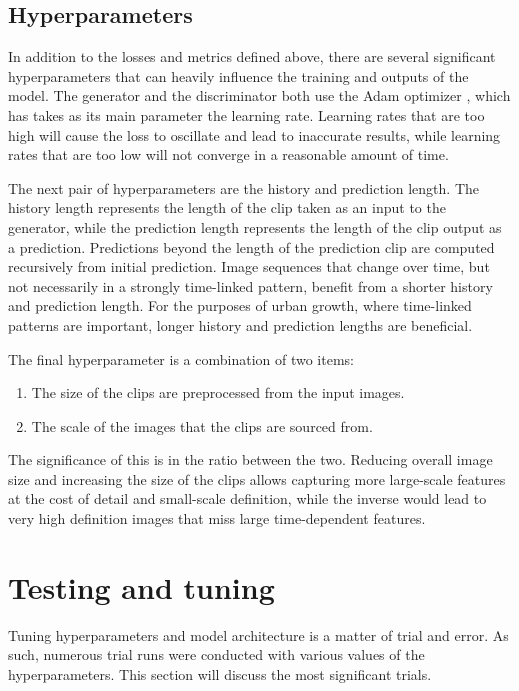 \documentclass{article}
\begin{document}
\clearpage

\subsection{Hyperparameters}

In addition to the losses and metrics defined above, there are several significant hyperparameters that can heavily influence the training and outputs of the model. The generator and the discriminator both use the Adam optimizer \cite{adam}, which has takes as its main parameter the learning rate. Learning rates that are too high will cause the loss to oscillate and lead to inaccurate results, while learning rates that are too low will not converge in a reasonable amount of time.

The next pair of hyperparameters are the history and prediction length. The history length represents the length of the clip taken as an input to the generator, while the prediction length represents the length of the clip output as a prediction. Predictions beyond the length of the prediction clip are computed recursively from initial prediction. Image sequences that change over time, but not necessarily in a strongly time-linked pattern, benefit from a shorter history and prediction length. For the purposes of urban growth, where time-linked patterns are important, longer history and prediction lengths are beneficial.

The final hyperparameter is a combination of two items:
\begin{enumerate}[label=(\alph*)]
    \item The size of the clips are preprocessed from the input images.
    \item The scale of the images that the clips are sourced from.
\end{enumerate}

The significance of this is in the ratio between the two. Reducing overall image size and increasing the size of the clips allows capturing more large-scale features at the cost of detail and small-scale definition, while the inverse would lead to very high definition images that miss large time-dependent features.

\clearpage

\section{Testing and tuning}

Tuning hyperparameters and model architecture is a matter of trial and error. As such, numerous trial runs were conducted with various values of the hyperparameters. This section will discuss the most significant trials.
\end{document}

